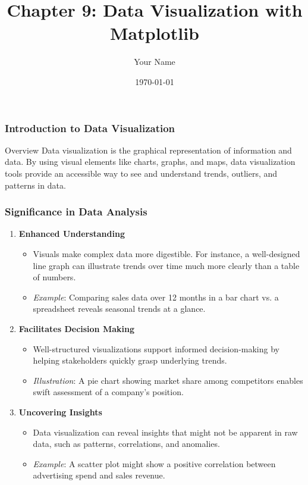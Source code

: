 \documentclass{beamer}
\title{Chapter 9: Data Visualization with Matplotlib}
\author{Your Name}
\institute{Your Institution}
\date{\today}
\begin{document}
\frame{\titlepage}

\begin{frame}[fragile]
    \frametitle{Introduction to Data Visualization}
    \begin{block}{Overview}
        Data visualization is the graphical representation of information and data. By using visual elements like charts, graphs, and maps, data visualization tools provide an accessible way to see and understand trends, outliers, and patterns in data.
    \end{block}
\end{frame}

\begin{frame}[fragile]
    \frametitle{Significance in Data Analysis}
    \begin{enumerate}
        \item \textbf{Enhanced Understanding}
            \begin{itemize}
                \item Visuals make complex data more digestible. For instance, a well-designed line graph can illustrate trends over time much more clearly than a table of numbers.
                \item \textit{Example}: Comparing sales data over 12 months in a bar chart vs. a spreadsheet reveals seasonal trends at a glance.
            \end{itemize}
        
        \item \textbf{Facilitates Decision Making}
            \begin{itemize}
                \item Well-structured visualizations support informed decision-making by helping stakeholders quickly grasp underlying trends.
                \item \textit{Illustration}: A pie chart showing market share among competitors enables swift assessment of a company’s position.
            \end{itemize}

        \item \textbf{Uncovering Insights}
            \begin{itemize}
                \item Data visualization can reveal insights that might not be apparent in raw data, such as patterns, correlations, and anomalies.
                \item \textit{Example}: A scatter plot might show a positive correlation between advertising spend and sales revenue.
            \end{itemize}


\end{enumerate}
\end{frame}
\end{document}
